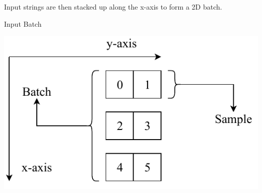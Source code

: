 \documentclass[a4paper, 12pt]{report}
\newcommand\tab[1][1cm]{\hspace*{#1}}
\begin{document}
\begin{tcbraster}[raster columns=2,raster rows=1,
	enhanced,size=small,fit algorithm=hybrid* ]
	\begin{tcolorbox}[frame hidden,colback=white]
		\tab Input strings are then stacked up \tab along the x-axis to form a 2D batch.
	\end{tcolorbox}
	\begin{inlinefigure}{Input Batch}
		\begin{center}
			\includegraphics[width=\textwidth]{input_final}
		\end{center}
	\end{inlinefigure}
\end{tcbraster}
\end{document}
